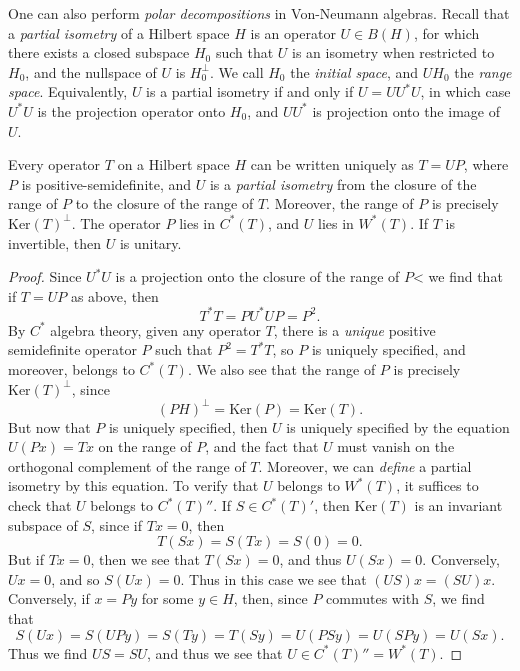 One can also perform \emph{polar decompositions} in Von-Neumann algebras. Recall that a \emph{partial isometry} of a Hilbert space $H$ is an operator $U \in B(H)$, for which there exists a closed subspace $H_0$ such that $U$ is an isometry when restricted to $H_0$, and the nullspace of $U$ is $H_0^\perp$. We call $H_0$ the \emph{initial space}, and $UH_0$ the \emph{range space}. Equivalently, $U$ is a partial isometry if and only if $U = UU^*U$, in which case $U^*U$ is the projection operator onto $H_0$, and $UU^*$ is projection onto the image of $U$.

\begin{theorem}
    Every operator $T$ on a Hilbert space $H$ can be written uniquely as $T = UP$, where $P$ is positive-semidefinite, and $U$ is a \emph{partial isometry} from the closure of the range of $P$ to the closure of the range of $T$. Moreover, the range of $P$ is precisely $\text{Ker}(T)^\perp$. The operator $P$ lies in $C^*(T)$, and $U$ lies in $W^*(T)$. If $T$ is invertible, then $U$ is unitary.
\end{theorem}
\begin{proof}
    Since $U^*U$ is a projection onto the closure of the range of $P$< we find that if $T = UP$ as above, then
    \[ T^*T = PU^*UP = P^2. \]
    By $C^*$ algebra theory, given any operator $T$, there is a \emph{unique} positive semidefinite operator $P$ such that $P^2 = T^*T$, so $P$ is uniquely specified, and moreover, belongs to $C^*(T)$. We also see that the range of $P$ is precisely $\text{Ker}(T)^\perp$, since
    \[ (PH)^\perp = \text{Ker}(P) = \text{Ker}(T). \]
    But now that $P$ is uniquely specified, then $U$ is uniquely specified by the equation $U(Px) = Tx$ on the range of $P$, and the fact that $U$ must vanish on the orthogonal complement of the range of $T$. Moreover, we can \emph{define} a partial isometry by this equation. To verify that $U$ belongs to $W^*(T)$, it suffices to check that $U$ belongs to $C^*(T)''$. If $S \in C^*(T)'$, then $\text{Ker}(T)$ is an invariant subspace of $S$, since if $Tx = 0$, then
    \[ T(Sx) = S(Tx) = S(0) = 0. \]
    But if $Tx = 0$, then we see that $T(Sx) = 0$, and thus $U(Sx) = 0$. Conversely, $Ux = 0$, and so $S(Ux) = 0$. Thus in this case we see that $(US)x = (SU)x$. Conversely, if $x = Py$ for some $y \in H$, then, since $P$ commutes with $S$, we find that
    \[ S(Ux) = S(UPy) = S(Ty) = T(Sy) = U(PSy) = U(SPy) = U(Sx). \]
    Thus we find $US = SU$, and thus we see that $U \in C^*(T)'' = W^*(T)$.
\end{proof}

